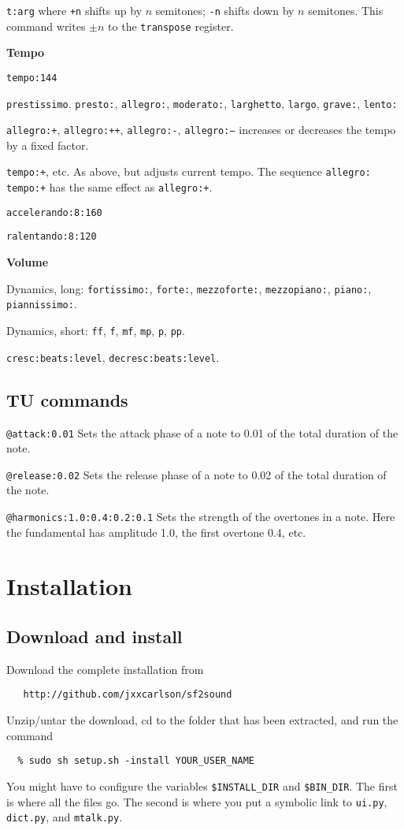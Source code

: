 \documentclass[11pt]{amsart}
\begin{document}
{\tt t:arg} where  {\tt +n} shifts up by $n$ semitones;
{\tt -n} shifts down by $n$ semitones.  This command writes $\pm n$ to the
{\tt transpose} register.

{\bf Tempo}


{\tt tempo:144}

{\tt prestissimo}. {\tt presto:}, {\tt allegro:}, {\tt moderato:}, {{\tt larghetto}, {\tt largo}, \tt grave:}, 
{\tt lento:}

{\tt allegro:+},  {\tt allegro:++}, {\tt allegro:-}, {\tt allegro:--} increases
or decreases the tempo by a fixed factor. 

{\tt tempo:+}, etc.  As above, but adjusts current tempo.  The sequence
{\tt allegro: tempo:+} has the same effect as {\tt allegro:+}.

{\tt accelerando:8:160}

{\tt ralentando:8:120}

{\bf Volume}

Dynamics, long: {\tt fortissimo:}, {\tt forte:}, {\tt mezzoforte:}, 
{\tt mezzopiano:}, {\tt piano:}, {\tt piannissimo:}.

Dynamics, short: {\tt ff},  {\tt f}, {\tt mf}, {\tt mp}, {\tt p}, {\tt pp}.

{\tt cresc:beats:level}, {\tt decresc:beats:level}. 


\subsection{TU commands}

{\tt @attack:0.01} Sets the attack phase of a note to 0.01 of the total duration of the note.

{\tt @release:0.02} Sets the release phase of a note to 0.02 of the total duration of the note.

{\tt @harmonics:1.0:0.4:0.2:0.1} Sets the strength of the overtones in a note. Here the fundamental
has amplitude 1.0, the first overtone 0.4, etc.



\section{Installation}


\subsection{Download and install}

Download the complete installation from 
\begin{verbatim}
   http://github.com/jxxcarlson/sf2sound
\end{verbatim}
Unzip/untar the download, cd to the folder that has been extracted, and 
run the command
\begin{verbatim}
  % sudo sh setup.sh -install YOUR_USER_NAME
\end{verbatim}
You might have to configure the variables {\tt \$INSTALL\_DIR} and
{\tt \$BIN\_DIR}. The first is where all the files go. The second
is where you put a symbolic link to {\tt ui.py}, {\tt dict.py}, 
and {\tt mtalk.py}. 
\end{document}
